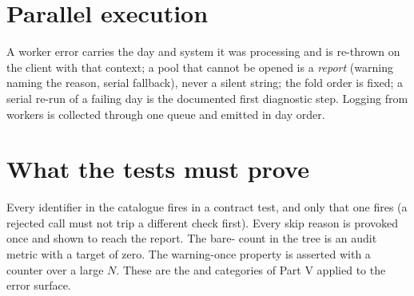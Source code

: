 \section{Parallel execution}

A worker error carries the day and system it was processing and is re-thrown on the client with that context; a pool that cannot be opened is a \emph{report} (warning naming the reason, serial fallback), never a silent  string; the fold order is fixed; a serial re-run of a failing day is the documented first diagnostic step. Logging from workers is collected through one queue and emitted in day order.

\section{What the tests must prove}

Every identifier in the catalogue fires in a contract test, and only that one fires (a rejected call must not trip a different check first). Every skip reason is provoked once and shown to reach the report. The bare- count in the tree is an audit metric with a target of zero. The warning-once property is asserted with a counter over a large $N$. These are the  and  categories of Part V applied to the error surface.
